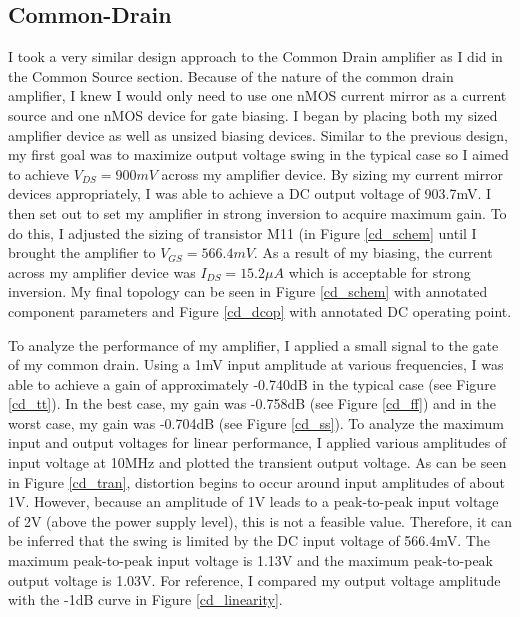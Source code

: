 \documentclass{article}
\begin{document}
\subsection{Common-Drain}
I took a very similar design approach to the Common Drain amplifier as I did in the Common Source section. Because of the nature of the common drain amplifier, I knew I would only need to use one nMOS current mirror as a current source and one nMOS device for gate biasing. I began by placing both my sized amplifier device as well as unsized biasing devices. Similar to the previous design, my first goal was to maximize output voltage swing in the typical case so I aimed to achieve $V_{DS} = 900mV$ across my amplifier device. By sizing my current mirror devices appropriately, I was able to achieve a DC output voltage of 903.7mV. I then set out to set my amplifier in strong inversion to acquire maximum gain. To do this, I adjusted the sizing of transistor M11 (in Figure \ref{cd_schem} until I brought the amplifier to $V_{GS} = 566.4mV$. As a result of my biasing, the current across my amplifier device was $I_{DS} = 15.2\mu A$ which is acceptable for strong inversion. My final topology can be seen in Figure \ref{cd_schem} with annotated component parameters and Figure \ref{cd_dcop} with annotated DC operating point.

To analyze the performance of my  amplifier, I applied a small signal to the gate of my common drain. Using a 1mV input amplitude at various frequencies, I was able to achieve a gain of approximately -0.740dB in the typical case (see Figure \ref{cd_tt}). In the best case, my gain was -0.758dB (see Figure \ref{cd_ff}) and in the worst case, my gain was -0.704dB (see Figure \ref{cd_ss}). To analyze the maximum input and output voltages for linear performance, I applied various amplitudes of input voltage at 10MHz and plotted the transient output voltage. As can be seen in Figure \ref{cd_tran}, distortion begins to occur around input amplitudes of about 1V. However, because an amplitude of 1V leads to a peak-to-peak input voltage of 2V (above the power supply level), this is not a feasible value. Therefore, it can be inferred that the swing is limited by the DC input voltage of 566.4mV. The maximum peak-to-peak input voltage is 1.13V and the maximum peak-to-peak output voltage is 1.03V. For reference, I compared my output voltage amplitude with the -1dB curve in Figure \ref{cd_linearity}.
\end{document}
